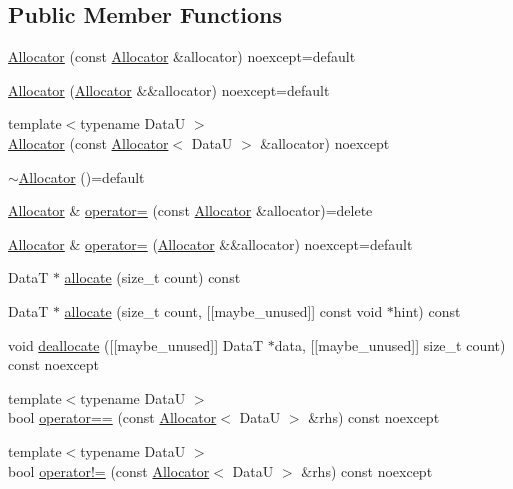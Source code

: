 \subsection*{Public Member Functions}
\begin{DoxyCompactItemize}
\item 
\hyperlink{classmage_1_1_memory_arena_1_1_allocator_ac7d640d69207604612c29ebc60ec6648}{Allocator} (const \hyperlink{classmage_1_1_memory_arena_1_1_allocator}{Allocator} \&allocator) noexcept=default
\item 
\hyperlink{classmage_1_1_memory_arena_1_1_allocator_a54ddc035b0987d71776c54a1240be18d}{Allocator} (\hyperlink{classmage_1_1_memory_arena_1_1_allocator}{Allocator} \&\&allocator) noexcept=default
\item 
{\footnotesize template$<$typename DataU $>$ }\\\hyperlink{classmage_1_1_memory_arena_1_1_allocator_a9485ec7437c3c798a37c67631aa7e8ab}{Allocator} (const \hyperlink{classmage_1_1_memory_arena_1_1_allocator}{Allocator}$<$ DataU $>$ \&allocator) noexcept
\item 
\hyperlink{classmage_1_1_memory_arena_1_1_allocator_a3324ead39d8cdfb8a119425879101e0a}{$\sim$\+Allocator} ()=default
\item 
\hyperlink{classmage_1_1_memory_arena_1_1_allocator}{Allocator} \& \hyperlink{classmage_1_1_memory_arena_1_1_allocator_a9774e6cb2e1f8ac94ee9f6a7be4f561a}{operator=} (const \hyperlink{classmage_1_1_memory_arena_1_1_allocator}{Allocator} \&allocator)=delete
\item 
\hyperlink{classmage_1_1_memory_arena_1_1_allocator}{Allocator} \& \hyperlink{classmage_1_1_memory_arena_1_1_allocator_a3b57cb5e78f00b8d024a042cbfae679d}{operator=} (\hyperlink{classmage_1_1_memory_arena_1_1_allocator}{Allocator} \&\&allocator) noexcept=default
\item 
DataT $\ast$ \hyperlink{classmage_1_1_memory_arena_1_1_allocator_a46d428590d87f47742abc173858ccc95}{allocate} (size\+\_\+t count) const
\item 
DataT $\ast$ \hyperlink{classmage_1_1_memory_arena_1_1_allocator_a699a98f902dddd5ad2b8477b8ed5f77b}{allocate} (size\+\_\+t count, \mbox{[}\mbox{[}maybe\+\_\+unused\mbox{]}\mbox{]} const void $\ast$hint) const
\item 
void \hyperlink{classmage_1_1_memory_arena_1_1_allocator_ab70a70d270ef6e2e1214ad26d660064a}{deallocate} (\mbox{[}\mbox{[}maybe\+\_\+unused\mbox{]}\mbox{]} DataT $\ast$data, \mbox{[}\mbox{[}maybe\+\_\+unused\mbox{]}\mbox{]} size\+\_\+t count) const noexcept
\item 
{\footnotesize template$<$typename DataU $>$ }\\bool \hyperlink{classmage_1_1_memory_arena_1_1_allocator_a7f7971d1bd4522ef847d30d1c5cf3666}{operator==} (const \hyperlink{classmage_1_1_memory_arena_1_1_allocator}{Allocator}$<$ DataU $>$ \&rhs) const noexcept
\item 
{\footnotesize template$<$typename DataU $>$ }\\bool \hyperlink{classmage_1_1_memory_arena_1_1_allocator_a3b20e43f85adbbd070f4dc6f3dca6eb1}{operator!=} (const \hyperlink{classmage_1_1_memory_arena_1_1_allocator}{Allocator}$<$ DataU $>$ \&rhs) const noexcept
\end{DoxyCompactItemize}

